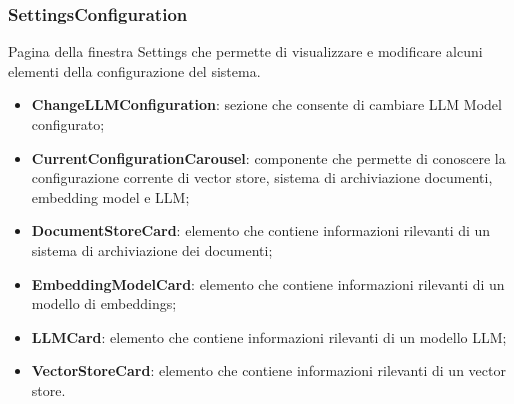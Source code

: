 \documentclass[10pt, a4paper]{article}
\begin{document}
\subsubsection{SettingsConfiguration}

Pagina della finestra Settings che permette di visualizzare e modificare alcuni elementi della configurazione del sistema.
\begin{itemize}
    \item \label{ChangeLLMConfiguration}\textbf{ChangeLLMConfiguration}: sezione che consente di cambiare LLM Model configurato;
    \item \label{CurrentConfigurationCarousel}\textbf{CurrentConfigurationCarousel}: componente che permette di conoscere la configurazione corrente di vector store, sistema di archiviazione documenti, embedding model e LLM;
    \item \label{DocumentStoreCard}\textbf{DocumentStoreCard}: elemento che contiene informazioni rilevanti di un sistema di archiviazione dei documenti;
    \item \label{EmbeddingModelCard}\textbf{EmbeddingModelCard}: elemento che contiene informazioni rilevanti di un modello di embeddings;
    \item \label{LLMCard}\textbf{LLMCard}: elemento che contiene informazioni rilevanti di un modello LLM; 
    \item \label{VectorStoreCard}\textbf{VectorStoreCard}: elemento che contiene informazioni rilevanti di un vector store.
    
    
\end{itemize}
\end{document}
